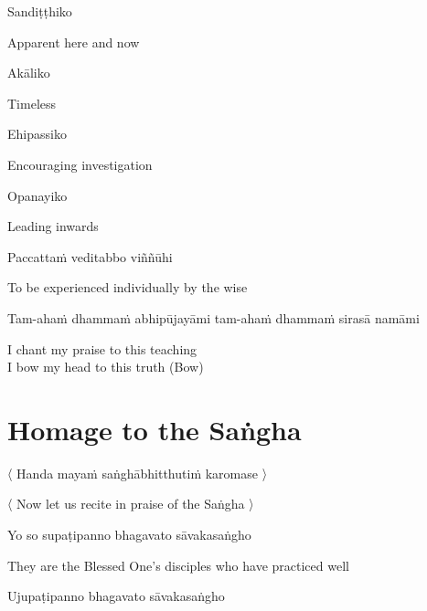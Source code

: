 Sandiṭṭhiko

\begin{english}
  Apparent here and now
\end{english}

Akāliko

\begin{english}
  Timeless
\end{english}

Ehipassiko

\begin{english}
  Encouraging investigation
\end{english}

Opanayiko

\begin{english}
  Leading inwards
\end{english}

Paccattaṁ veditabbo viññūhi

\begin{english}
  To be experienced individually by the wise
\end{english}

\begin{pali-hang}
  Tam-ahaṁ dhammaṁ abhipūjayāmi tam-ahaṁ dhammaṁ sirasā namāmi
\end{pali-hang}

\begin{english}
  I chant my praise to this teaching\\
  I bow my head to this truth \hfill{(Bow)}
\end{english}

\section{Homage to the Saṅgha}
\label{homage-sangha}

\begin{leader}
  〈 Handa mayaṁ saṅghābhitthutiṁ karomase 〉
\end{leader}
\begin{leader-english}
  〈 Now let us recite in praise of the Saṅgha 〉
\end{leader-english}

Yo so supaṭipanno bhagavato sāvakasaṅgho

\begin{english}
  They are the Blessed One's disciples who have practiced well
\end{english}

Ujupaṭipanno bhagavato sāvakasaṅgho

